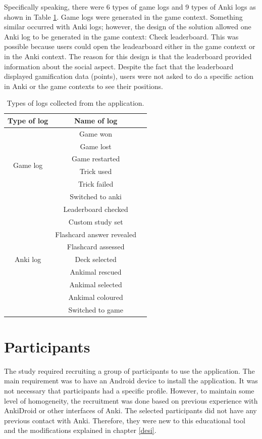 Specifically speaking, there were 6 types of game logs and 9 types of Anki logs as shown in Table \ref{tab:log-types}. Game logs were generated in the game context. Something similar occurred with Anki logs; however, the design of the solution allowed one Anki log to be generated in the game context: Check leaderboard. This was possible because users could open the leadearboard either in the game context or in the Anki context. The reason for this design is that the leaderboard provided information about the social aspect. Despite the fact that the leaderboard displayed gamification data (points), users were not asked to do a specific action in Anki or the game contexts to see their positions.

\begin{table}[!htb]
    \centering
    {\renewcommand{\arraystretch}{1}
        \begin{tabular}{ |c|c|c| }
            \hline
            \textbf{Type of log} & \textbf{Name of log} \\
            \hline
            \multirow{6}{3cm}{Game log} &  Game won\\
            & Game lost \\
            & Game restarted \\
            & Trick used \\
            & Trick failed \\
            & Switched to anki \\
            \hline
            \multirow{9}{3cm}{Anki log} &  Leaderboard checked\\
            & Custom study set \\
            & Flashcard answer revealed\\
            & Flashcard assessed \\
            & Deck selected \\
            & Ankimal rescued\\
            & Ankimal selected\\
            & Ankimal coloured\\
            & Switched to game \\
            \hline
        \end{tabular}
    }
    \caption{Types of logs collected from the application.}
    \label{tab:log-types}
\end{table}

\section{Participants}
\label{participants}
The study required recruiting a group of participants to use the application. The main requirement was to have an Android device to install the application. It was not necessary that participants had a specific profile. However, to maintain some level of homogeneity, the recruitment was done based on previous experience with AnkiDroid or other interfaces of Anki. The selected participants did not have any previous contact with Anki. Therefore, they were new to this educational tool and the modifications explained in chapter \ref{desi}.

